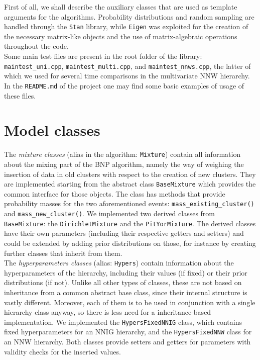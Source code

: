First of all, we shall describe the auxiliary classes that are used as template arguments for the algorithms.
Probability distributions and random sampling are handled through the \verb|Stan| library, while \verb|Eigen| was exploited for the creation of the necessary matrix-like objects and the use of matrix-algebraic operations throughout the code. \\
Some main test files are present in the root folder of the library: \verb|maintest_uni.cpp|, \verb|maintest_multi.cpp|, and \verb|maintest_nnws.cpp|, the latter of which we used for several time comparisons in the multivariate NNW hierarchy.
In the \verb|README.md| of the project one may find some basic examples of usage of these files.

\section{Model classes}
The \emph{mixture classes} (alias in the algorithm: \verb|Mixture|) contain all information about the mixing part of the BNP algorithm, namely the way of weighing the insertion of data in old clusters with respect to the creation of new clusters.
They are implemented starting from the abstract class \verb|BaseMixture| which provides the common interface for those objects.
The class has methods that provide probability masses for the two aforementioned events: \verb|mass_existing_cluster()| and \verb|mass_new_cluster()|.
We implemented two derived classes from \verb|BaseMixture|: the \verb|DirichletMixture| and the \verb|PitYorMixture|.
The derived classes have their own parameters (including their respective getters and setters) and could be extended by adding prior distributions on those, for instance by creating further classes that inherit from them. \\

The \emph{hyperparameters classes} (alias: \verb|Hypers|) contain information about the hyperparameters of the hierarchy, including their values (if fixed) or their prior distributions (if not).
Unlike all other types of classes, these are not based on inheritance from a common abstract base class, since their internal structure is vastly different.
Moreover, each of them is to be used in conjunction with a single hierarchy class anyway, so there is less need for a inheritance-based implementation.
We implemented the \verb|HypersFixedNNIG| class, which contains fixed hyperparameters for an NNIG hierarchy, and the \verb|HypersFixedNNW| class for an NNW hierarchy.
Both classes provide setters and getters for parameters with validity checks for the inserted values. \\

